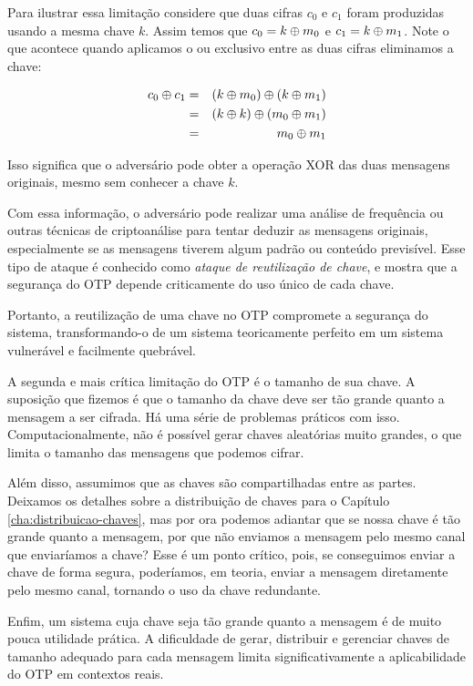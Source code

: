 Para ilustrar essa limitação considere que duas cifras $c_0$ e $c_1$ foram produzidas usando a mesma chave $k$.
Assim temos que $c_0 = k \oplus m_0$ e $c_1 = k \oplus m_1$.
Note o que acontece quando aplicamos o ou exclusivo entre as duas cifras eliminamos a chave:

\begin{eqnarray*}
  c_0 \oplus c_1 & = & (k \oplus m_0) \oplus (k \oplus m_1)\\
              & = & (k \oplus k) \oplus (m_0 \oplus m_1)\\
              & = & m_0 \oplus m_1
\end{eqnarray*}

Isso significa que o adversário pode obter a operação XOR das duas mensagens originais, mesmo sem conhecer a chave $k$.

Com essa informação, o adversário pode realizar uma análise de frequência ou outras técnicas de criptoanálise para tentar deduzir as mensagens originais, especialmente se as mensagens tiverem algum padrão ou conteúdo previsível.
Esse tipo de ataque é conhecido como {\em ataque de reutilização de chave}, e mostra que a segurança do OTP depende criticamente do uso único de cada chave.

Portanto, a reutilização de uma chave no OTP compromete a segurança do sistema, transformando-o de um sistema teoricamente perfeito em um sistema vulnerável e facilmente quebrável.

A segunda e mais crítica limitação do OTP é o tamanho de sua chave.
A suposição que fizemos é que o tamanho da chave deve ser tão grande quanto a mensagem a ser cifrada.
Há uma série de problemas práticos com isso.
Computacionalmente, não é possível gerar chaves aleatórias muito grandes, o que limita o tamanho das mensagens que podemos cifrar.

Além disso, assumimos que as chaves são compartilhadas entre as partes.
Deixamos os detalhes sobre a distribuição de chaves para o Capítulo \ref{cha:distribuicao-chaves}, mas por ora podemos adiantar que se nossa chave é tão grande quanto a mensagem, por que não enviamos a mensagem pelo mesmo canal que enviaríamos a chave?
Esse é um ponto crítico, pois, se conseguimos enviar a chave de forma segura, poderíamos, em teoria, enviar a mensagem diretamente pelo mesmo canal, tornando o uso da chave redundante.

Enfim, um sistema cuja chave seja tão grande quanto a mensagem é de muito pouca utilidade prática.
A dificuldade de gerar, distribuir e gerenciar chaves de tamanho adequado para cada mensagem limita significativamente a aplicabilidade do OTP em contextos reais.

